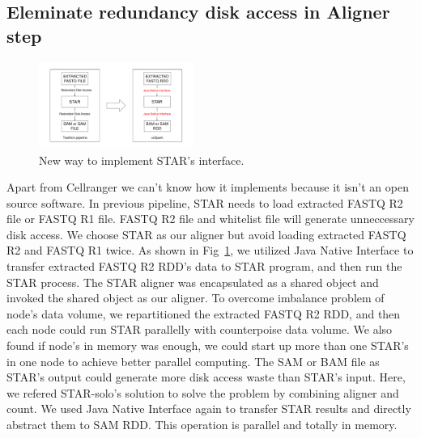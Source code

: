 \documentclass[10pt,journal,compsoc]{IEEEtran}
\begin{document}
\subsection{Eleminate redundancy disk access in Aligner step}
\begin{figure}
	\includegraphics[width=0.45\textwidth]{fig2.pdf}
	\caption{New way to implement STAR's interface.} \label{fig2}
\end{figure}
Apart from Cellranger we can't know how it implements because it isn't an open source software. 
In previous pipeline, STAR needs to load extracted FASTQ R2 file or FASTQ R1 file. FASTQ R2 file and whitelist file will generate unneccessary disk access. 
We choose STAR as our aligner but avoid loading extracted FASTQ R2 and FASTQ R1 twice. 
As shown in Fig~\ref{fig2}, we utilized Java Native Interface to transfer extracted FASTQ R2 RDD's data to STAR program, and then run the STAR process.
The STAR aligner was encapsulated as a shared object and invoked the shared object as our aligner. 
To overcome imbalance problem of node's data volume, we repartitioned the extracted FASTQ R2 RDD, and then each node could run STAR parallelly with counterpoise data volume. 
We also found if node's in memory was enough, we could start up more than one STAR's in one node to achieve better parallel computing. 
The SAM or BAM file as STAR's output could generate more disk access waste than STAR's input. Here, we refered STAR-solo's solution to solve the problem by combining aligner and count. 
We used Java Native Interface again to transfer STAR results and directly abstract them to SAM RDD. 
This operation is parallel and totally in memory. 
\end{document}
